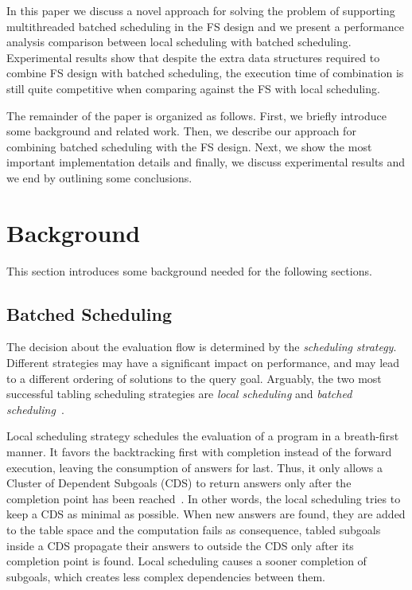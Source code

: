 \documentclass{llncs}
\begin{document}
In this paper we discuss a novel approach for solving the problem of
supporting multithreaded batched scheduling in the FS design and we
present a performance analysis comparison between local scheduling
with batched scheduling. Experimental results show that despite the
extra data structures required to combine FS design with batched
scheduling, the execution time of combination is still quite
competitive when comparing against the FS with local scheduling.

The remainder of the paper is organized as follows. First, we briefly
introduce some background and related work. Then, we describe our
approach for combining batched scheduling with the FS design. Next, we
show the most important implementation details and finally, we discuss
experimental results and we end by outlining some conclusions.

\section{Background}

This section introduces some background needed for the following
sections. 

\subsection{Batched Scheduling}

The decision about the evaluation flow is determined by the
\emph{scheduling strategy}. Different strategies may have a
significant impact on performance, and may lead to a different
ordering of solutions to the query goal. Arguably, the two most
successful tabling scheduling strategies are \emph{local scheduling}
and \emph{batched scheduling}~\cite{Freire-96}.

Local scheduling strategy schedules the evaluation of a program in a
breath-first manner. It favors the backtracking first with completion
instead of the forward execution, leaving the consumption of answers
for last. Thus, it only allows a Cluster of Dependent Subgoals (CDS)
to return answers only after the completion point has been
reached~\cite{Freire-96}. In other words, the local scheduling tries
to keep a CDS as minimal as possible. When new answers are found, they
are added to the table space and the computation fails as consequence,
tabled subgoals inside a CDS propagate their answers to outside the
CDS only after its completion point is found. Local scheduling causes
a sooner completion of subgoals, which creates less complex
dependencies between them.
\end{document}
